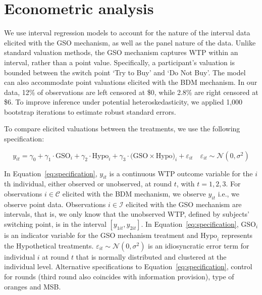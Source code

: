 \documentclass[12pt]{article}
\begin{document}


\section{Econometric analysis}
\label{Econometric}
We use interval regression models to account for the nature of the interval data elicited with the GSO mechanism, as well as the panel nature of the data. Unlike standard valuation methods, the GSO mechanism captures WTP within an interval, rather than a point value. Specifically, a participant's valuation is bounded between the switch point `Try to Buy' and `Do Not Buy'. The model can also accommodate point valuations elicited with the BDM mechanism. In our data, 12\% of observations are left censored at \$0, while 2.8\% are right censored at \$6. To improve inference under potential heteroskedasticity, we applied 1,000 bootstrap iterations to estimate robust standard errors.

To compare elicited valuations between the treatments, we use the following specification:
\vspace{-1cm}

\begin{equation}\label{eq:specification}
y_{it} = \gamma_0 + \gamma_1 \cdot \text{GSO}_i + \gamma_2 \cdot \text{Hypo}_i + \gamma_3 \cdot \text{(GSO} \times \text{Hypo)}_i +  \varepsilon_{it} 
\quad \varepsilon_{it} \sim \mathcal{N}(0, \sigma^2)
\end{equation}


In Equation~\ref{eq:specification}, $y_{it}$ is a continuous WTP outcome variable for the $i$th individual, either observed or unobserved, at round $t$, with $t = 1, 2, 3$. For observations $i \in \mathcal{C}$ elicited with the BDM mechanism, we observe $y_{it}$ i.e., we observe point data. Observations $i\in \mathcal{I}$ elicited with the GSO mechanism are intervals, that is, we only know that the unobserved WTP, defined by subjects' switching point, is in the interval $[y_{1it}, y_{2it}]$. In Equation~\ref{eq:specification}, $\text{GSO}_i$ is an indicator variable for the GSO mechanism treatment and $\text{Hypo}_i$ represents the Hypothetical treatments. $\varepsilon_{it} \sim \mathcal{N}(0, \sigma^2)$ is an idiosyncratic error term for individual $i$ at round $t$ that is normally distributed and clustered at the individual level.
Alternative specifications to Equation~\ref{eq:specification}, control for rounds (third round also coincides with information provision), type of oranges and MSB.
\end{document}

